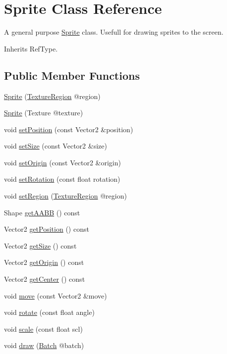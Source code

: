 \hypertarget{class_sprite}{\section{Sprite Class Reference}
\label{class_sprite}
}


A general purpose \hyperlink{class_sprite}{Sprite} class. Usefull for drawing sprites to the screen.  




Inherits Ref\+Type.

\subsection*{Public Member Functions}
\begin{DoxyCompactItemize}
\item 
\hyperlink{class_sprite_a29de4e0fc43c90ee54630f821fae3f6d}{Sprite} (\hyperlink{class_texture_region}{Texture\+Region} @region)
\item 
\hyperlink{class_sprite_a1b68b64346a1c99280740e825de21ec8}{Sprite} (Texture @texture)
\item 
void \hyperlink{class_sprite_a5c42a8a652adfd7a2185229dfa8a2f99}{set\+Position} (const Vector2 \&position)
\item 
void \hyperlink{class_sprite_a33fe51395aa3d372a16ccda8df5c7b12}{set\+Size} (const Vector2 \&size)
\item 
void \hyperlink{class_sprite_a56199a8edb085342da44857635ec091a}{set\+Origin} (const Vector2 \&origin)
\item 
void \hyperlink{class_sprite_aad424b86963bde58e6f62074c4b2c037}{set\+Rotation} (const float rotation)
\item 
void \hyperlink{class_sprite_a8605a40678e4454062a6e4be6069d99f}{set\+Region} (\hyperlink{class_texture_region}{Texture\+Region} @region)
\item 
Shape \hyperlink{class_sprite_aa303c8d552308024a59159da86603fa1}{get\+A\+A\+B\+B} () const 
\item 
Vector2 \hyperlink{class_sprite_ab02f4333185e9ecd2830266cce22004d}{get\+Position} () const 
\item 
Vector2 \hyperlink{class_sprite_a1db7848ab8886b382e56889c2a0195a4}{get\+Size} () const 
\item 
Vector2 \hyperlink{class_sprite_ac7e4e3b1670311a87c63d5424ec27ea5}{get\+Origin} () const 
\item 
Vector2 \hyperlink{class_sprite_a209c829098440c836e4fb10f41bb0aea}{get\+Center} () const 
\item 
void \hyperlink{class_sprite_a8b25650441ad72d3c449494607d8dbda}{move} (const Vector2 \&move)
\item 
void \hyperlink{class_sprite_a157bcaff0e3fb4f62ed9ad139a27b0ad}{rotate} (const float angle)
\item 
void \hyperlink{class_sprite_a6400777edb313463aac0a4b60dd1e011}{scale} (const float scl)
\item 
void \hyperlink{class_sprite_a5273752c722df11cbf6f61d7ef9e18bb}{draw} (\hyperlink{class_batch}{Batch} @batch)
\end{DoxyCompactItemize}


